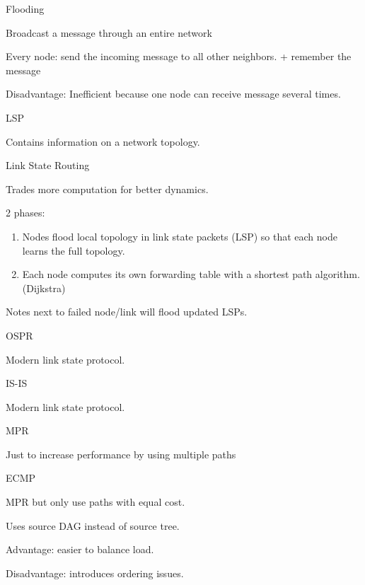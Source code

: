 \documentclass[main.tex]{subfiles}
\begin{document}
\begin{card}{Flooding}
\item Broadcast a message through an entire network
\item Every node: send the incoming message to all other neighbors. + remember the message
\item Disadvantage: Inefficient because one node can receive message several times.
\end{card}

\begin{card}{LSP}
\item Contains information on a network topology.
\end{card}

\begin{card}{Link State Routing}
\item Trades more computation for better dynamics.
\item 2 phases:
    \begin{enumerate}
        \item Nodes flood local topology in link state packets (LSP) so that each node learns the full topology.
        \item Each node computes its own forwarding table with a shortest path algorithm. (Dijkstra)
    \end{enumerate}
\item Notes next to failed node/link will flood updated LSPs.
\end{card}

\begin{card}{OSPR}
\item Modern link state protocol.
\end{card}

\begin{card}{IS-IS}
\item Modern link state protocol.
\end{card}

\begin{card}{MPR}
\item Just to increase performance by using multiple paths
\end{card}

\begin{card}{ECMP}
\item MPR but only use paths with equal cost.
\item Uses source DAG instead of source tree.
\item Advantage: easier to balance load.
\item Disadvantage: introduces ordering issues.
\end{card}
\end{document}
